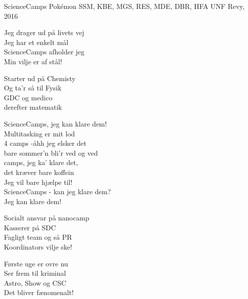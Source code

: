 \begin{song}{ScienceCamps}
  {} %
  {Pokémon} %
  {SSM, KBE, MGS, RES, MDE, DBR, HFA} %
  {UNF Revy, 2016} %
  {\NotCCLIed} %

  \begin{SBVerse}
    Jeg drager ud på livets vej\\
    Jeg har et enkelt mål\\
    ScienceCamps afholder jeg\\
    Min vilje er af stål!
  \end{SBVerse}

  \begin{SBVerse}
    Starter ud på Chemisty\\
    Og ta’r så til Fysik\\
    GDC og medico\\
    derefter matematik
  \end{SBVerse}

  \begin{SBChorus}
    ScienceCamps, jeg kan klare dem!\\
    Multitasking er mit lod\\
    4 camps -åhh jeg elsker det\\
    bare sommer’n bli’r ved og ved\\ camps, jeg ka’ klare det,\\
    det kræver bare koffein\\
    Jeg vil bare hjælpe til!\\
    ScienceCamps - kan jeg klare dem?\\
    Jeg kan klare dem!
  \end{SBChorus}

  \begin{SBVerse}
    Socialt ansvar på nanocamp\\
    Kasserer på SDC\\
    Fagligt team og så PR\\
    Koordinators vilje ske!
  \end{SBVerse}

  \begin{SBVerse}
    Første uge er ovre nu\\
    Ser frem til kriminal\\
    Astro, Show og CSC\\
    Det bliver fænomenalt!
  \end{SBVerse}


\end{song}
